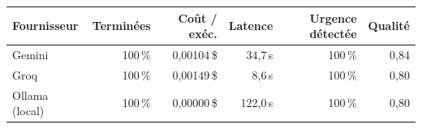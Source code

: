 \begin{tabular}{lrrrrr}
\toprule
\textbf{Fournisseur} & \textbf{Terminées} & \textbf{Coût / exéc.} & \textbf{Latence} & \textbf{Urgence détectée} & \textbf{Qualité} \\
\midrule
Gemini & 100\,\% & 0,00104\,\$ & 34,7\,s & 100\,\% & 0,84 \\
Groq & 100\,\% & 0,00149\,\$ & 8,6\,s & 100\,\% & 0,80 \\
Ollama (local) & 100\,\% & 0,00000\,\$ & 122,0\,s & 100\,\% & 0,80 \\
\bottomrule
\end{tabular}
